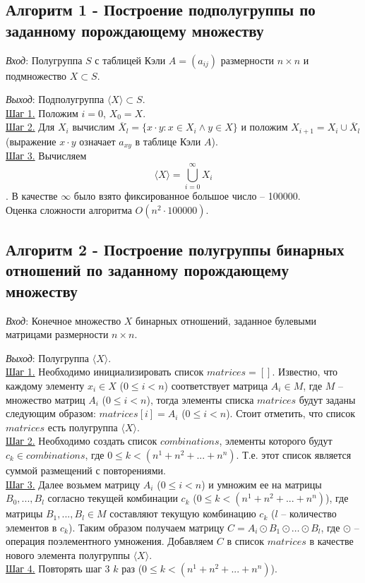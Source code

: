 \documentclass[bachelor, och, labwork]{shiza}
\begin{document}
    \subsection{Алгоритм 1 - Построение подполугруппы по заданному порождающему множеству}

    \textit{Вход}: Полугруппа $S$ с таблицей Кэли $A = (a_{ij})$ размерности $n \times n$ и подмножество $X \subset
    S$.

    \textit{Выход}: Подполугруппа $\langle X \rangle \subset S$.\\
    \underline{Шаг 1.} Положим $i = 0$, $X_0 = X$.\\
    \underline{Шаг 2.} Для $X_i$ вычислим $\overline{X}_l = \{x \cdot y : x \in X_i \wedge y \in X \}$ и положим $X_{i + 1} = X_i \cup \overline{X}_l$ (выражение $x \cdot y$ означает $a_{xy}$ в таблице Кэли $A$). \\
    \underline{Шаг 3.} Вычисляем \[\langle X \rangle = \bigcup^\infty_{i = 0} X_i \]. В качестве $\infty$ было взято фиксированное большое число -- 100000.\\
    
    Оценка сложности алгоритма $O(n^2 \cdot 100000)$.\\

    \subsection{Алгоритм 2 - Построение полугруппы бинарных отношений по заданному порождающему множеству}

        \textit{Вход}: Конечное множество $X$ бинарных отношений, заданное булевыми матрицами размерности $n \times n$.

        \textit{Выход}: Полугруппа $\langle X \rangle$.\\
        \underline{Шаг 1.} Необходимо инициализировать список $matrices = []$. Известно, что каждому элементу $x_i \in X$ ($0 \leq i < n$)
        соответствует матрица $A_i \in M$, где $M$ -- множество матриц $A_i$ ($0 \leq i < n$), тогда элементы списка $matrices$ будут
        заданы следующим образом: $matrices[i] = A_i$ ($0 \leq i < n$). Стоит отметить, что список $matrices$ есть полугруппа $\langle X \rangle$.\\
        \underline{Шаг 2.} Необходимо создать список $combinations$, элементы которого будут $c_k \in combinations$, где $0 \leq k < (n^1 + n^2 + ... + n^n)$.
        Т.е. этот список является суммой размещений с повторениями.\\
        \underline{Шаг 3.} Далее возьмем матрицу $A_i$ ($0 \leq i < n$) и умножим ее на матрицы $B_0, ..., B_l$ согласно текущей комбинации $c_k$ 
        ($0 \leq k < (n^1 + n^2 + ... + n^n)$), где матрицы $B_1, ..., B_l \in M$ составляют текущую комбинацию $c_k$ ($l$ -- количество элементов в $c_k$).
        Таким образом получаем матрицу $C = A_i \odot B_1 \odot \dots \odot B_l$, где $\odot$ -- операция поэлементного умножения. 
        Добавляем $C$ в список $matrices$ в качестве нового элемента полугруппы $\langle X \rangle$.\\
        \underline{Шаг 4.} Повторять шаг 3 $k$ раз ($0 \leq k < (n^1 + n^2 + ... + n^n)$). \\
\end{document}
